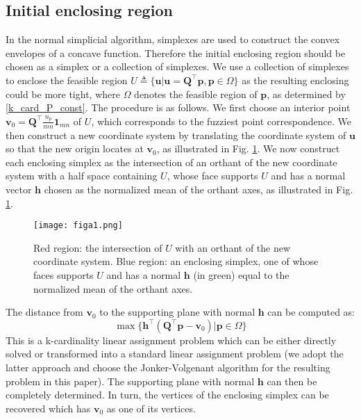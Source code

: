 \documentclass[11pt,bezier,]{article}
\begin{document}
\subsection{Initial enclosing region \label{subsec:init}
}
In the normal simplicial algorithm, 
simplexes are used to construct the convex envelopes of a concave function. 
Therefore the initial enclosing region should be chosen as a simplex or a collection of simplexes.
We use a collection of simplexes to enclose the feasible region 
$U\triangleq\{\mathbf u|\mathbf u=\mathbf Q^\top\mathbf p, \mathbf p\in \Omega\}$ 
as the resulting enclosing could be more tight,
where $\Omega$ denotes the feasible region of $\mathbf p$,
as determined by \eqref{k_card_P_const}.
The procedure is as follows. 
We first choose an interior point 
$\mathbf v_0=\mathbf Q^\top  \frac{n_p}{mn}\mathbf 1_{mn}$ of $U$,
which corresponds to the fuzziest point correspondence. 
We then construct a new coordinate system by translating  the coordinate system of $\mathbf u$
so that the new origin  locates at $\mathbf v_0$,
as illustrated in Fig. \ref{bound_simp}.
We now construct each enclosing simplex 
as the intersection of an orthant of the new coordinate system 
with a half space containing $U$, 
whose face %
supports $U$ and has a normal vector $\mathbf h$ chosen as the normalized mean of the orthant axes,
as illustrated in 
Fig. \ref{bound_simp}.


\begin{figure}[h]
\centering
 \texttt{[image: figa1.png]}
 
\caption{
Red region: 
the intersection of  $U$ with an orthant of the new coordinate system.
Blue region: 
an enclosing simplex,
one of whose  faces supports $U$ 
and has a normal  $\mathbf h$ (in green)
 equal to  the normalized mean of the orthant axes. 
\label{bound_simp}}
\end{figure}

The distance from $\mathbf v_0$ to the supporting plane with normal $\mathbf h$ can be computed as: 
\begin{equation}\label{support_plane}
 \max \{ \mathbf h^\top (\mathbf Q^\top \mathbf p - \mathbf v_0) | \mathbf p\in \Omega\}
\end{equation}
This is a k-cardinality linear assignment problem 
which can be either directly solved \cite{k_card_assign_direct} 
or transformed into a standard linear assignment problem \cite{k_card_assign_transform}
(we adopt the latter approach and choose the Jonker-Volgenant algorithm \cite{LAPJV}
for the resulting problem in this paper). 
The supporting plane with normal $\mathbf h$ can then be completely determined.
In turn, the vertices of the enclosing simplex can be recovered which has $\mathbf v_0$ as one of its vertices.
\end{document}
